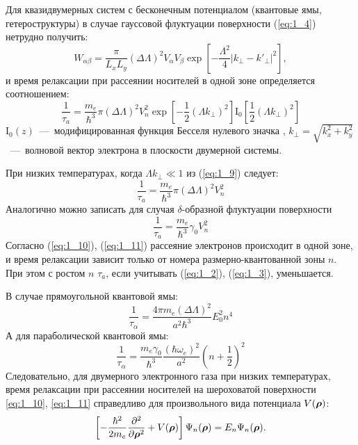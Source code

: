 Для квазидвумерных систем с бесконечным потенциалом (квантовые ямы, гетероструктуры) в случае гауссовой флуктуации поверхности (\ref{eq:1_4}) нетрудно получить:
\begin{equation} \label{eq:1_9_0}
W_{\alpha\beta} =\frac{\pi }{L_x L_y} (\Delta \Lambda )^2 V_{\alpha} V_{\beta } \exp \left[-\frac{\Lambda^2 }{4} \left|k_{\bot } -k'_{\bot } \right|^2 \right],
\end{equation}
и время релаксации при рассеянии носителей в одной зоне определяется соотношением:
\begin{equation} \label{eq:1_9}
\frac{1}{\tau_a}=\frac{m_e}{\hbar^3}\pi{(\Delta \Lambda)}^2 V_n^2 \exp{\left[-\frac{1}{2}(\Lambda k_\bot )^2\right]} \mathrm{I}_0 \left[\frac{1}{2}(\Lambda k_\bot)^2\right]
\end{equation}
$\mathrm{I}_0(z)$~---~модифицированная функция Бесселя нулевого значка \cite{Abramowitz1979}, $k_\bot = \sqrt{k^2_x+k^2_y}$~---~волновой вектор электрона в плоскости двумерной системы.

При низких температурах, когда $\Lambda k_\bot \ll 1$ из (\ref{eq:1_9}) следует:
\begin{equation} \label{eq:1_10}
\frac{1}{\tau_a}=\frac{m_e }{\hbar^3}\pi (\Delta \Lambda)^2 V_n^2
\end{equation}
Аналогично можно записать для случая $\delta$-образной флуктуации поверхности
\begin{equation} \label{eq:1_11}
\frac{1}{\tau_a}=\frac{m_e}{\hbar^3}\gamma_0 V_n^2
\end{equation}
Согласно (\ref{eq:1_10}), (\ref{eq:1_11}) рассеяние электронов происходит в одной зоне, и время релаксации зависит только от номера размерно-квантованной зоны $n$. При этом с ростом $n$ $\tau_a$, если учитывать (\ref{eq:1_2}), (\ref{eq:1_3}), уменьшается.

В случае прямоугольной квантовой ямы:
\begin{equation}
\frac{1}{\tau_\alpha} = \frac{4\pi m_e (\Delta \Lambda)^2 }{a^2 \hbar^3} E_0^2 n^4 
\end{equation}
А для параболической квантовой ямы:
\begin{equation} \label{eq:1_14}
\frac{1}{\tau_\alpha} = \frac{m_e \gamma_0}{\hbar^3} \frac{(\hbar\omega_e)^2}{a^2}{\left(n + \frac{1}{2}\right)}^2
\end{equation}
Следовательно, для двумерного электронного газа при низких температурах, время релаксации при рассеянии носителей на шероховатой поверхности \eqref{eq:1_10}, \eqref{eq:1_11} справедливо для произвольного вида потенциала $V(\boldsymbol{\mathbf{\rho}})$:
\[
\left[-\frac{\hbar^2}{2m_e}\frac{\partial^2}{\partial \boldsymbol{\mathbf{\rho}}^2}+V(\boldsymbol{\mathbf{\rho}})\right]\Psi_n(\boldsymbol{\mathbf{\rho}})=E_n\Psi_n(\boldsymbol{\mathbf{\rho}}).
\]

